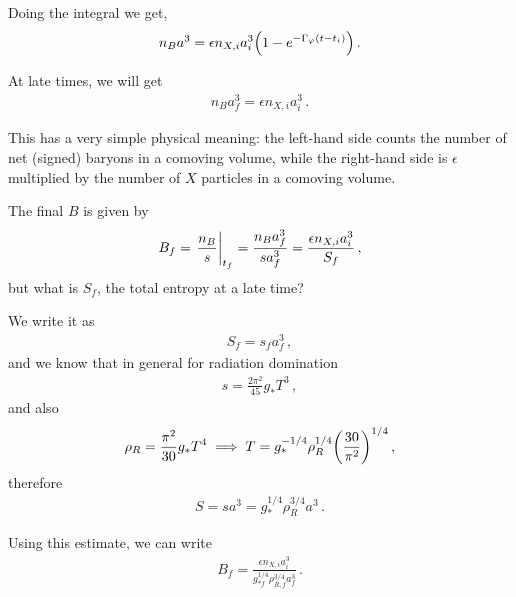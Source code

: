 \documentclass[main.tex]{subfiles}
\begin{document}
Doing the integral we get, 
%
\begin{align}
n_B a^3 = \epsilon n_{X, i} a_i^3 \qty(1 - e^{- \Gamma _\varphi (t - t_i)})
\,.
\end{align}

At late times, we will get 
%
\begin{align}
n_B a_f^3 = \epsilon n_{X, i} a_i^3
\,.
\end{align}

This has a very simple physical meaning: the left-hand side counts the number of net (signed) baryons in a comoving volume, while the right-hand side is \(\epsilon \) multiplied by the number of \(X\) particles in a comoving volume. 

The final \(B\) is given by 
%
\begin{align}
B_f = \eval{\frac{n_B}{s}}_{t_f} = \frac{n_B a_f^3}{s a_f^3} = \frac{\epsilon n_{X, i} a_i^3}{S_f}
\,,
\end{align}
%
but what is \(S_f\), the total entropy at a late time?

We write it as 
%
\begin{align}
S_f =s_f a_f^3
\,,
\end{align}
%
and we know that in general for radiation domination 
%
\begin{align}
s = \frac{2 \pi^2}{45} g_* T^3
\,,
\end{align}
%
and also 
%
\begin{align}
\rho _R = \frac{\pi^2}{30} g_* T^{4} \implies T = g_*^{-1/4} \rho _R^{1/4} \qty(\frac{30}{\pi^2})^{1/4}
\,,
\end{align}
%
therefore 
%
\begin{align}
S = s a^3 = g_*^{1/4} \rho _R^{3/4} a^3
\,.
\end{align}

Using this estimate, we can write 
%
\begin{align}
B_f = \frac{\epsilon n_{X, i} a_i^3}{g_{*f}^{1/4} \rho _{R, f}^{3/4} a_f^3}
\,.
\end{align}
\end{document}
